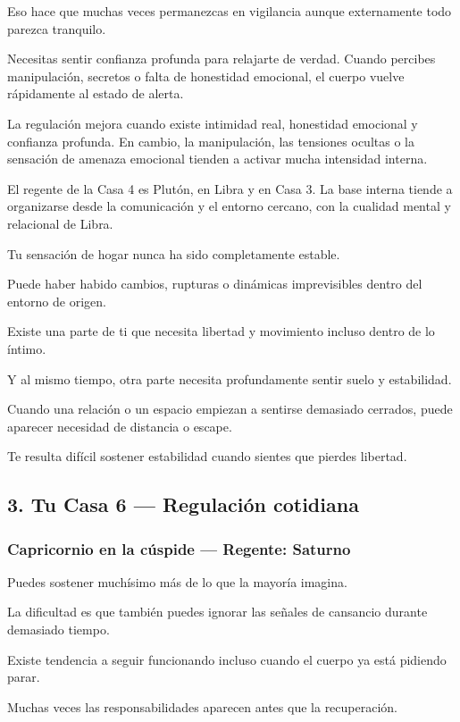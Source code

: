 \documentclass[11pt,a4paper]{article}
\begin{document}
Eso hace que muchas veces permanezcas en vigilancia aunque externamente todo parezca tranquilo.

Necesitas sentir confianza profunda para relajarte de verdad. Cuando percibes manipulación, secretos o falta de honestidad emocional, el cuerpo vuelve rápidamente al estado de alerta.

La regulación mejora cuando existe intimidad real, honestidad emocional y confianza profunda. En cambio, la manipulación, las tensiones ocultas o la sensación de amenaza emocional tienden a activar mucha intensidad interna.

El regente de la Casa 4 es Plutón, en Libra y en Casa 3. La base interna tiende a organizarse desde la comunicación y el entorno cercano, con la cualidad mental y relacional de Libra.

Tu sensación de hogar nunca ha sido completamente estable.

Puede haber habido cambios, rupturas o dinámicas imprevisibles dentro del entorno de origen.

Existe una parte de ti que necesita libertad y movimiento incluso dentro de lo íntimo.

Y al mismo tiempo, otra parte necesita profundamente sentir suelo y estabilidad.

Cuando una relación o un espacio empiezan a sentirse demasiado cerrados, puede aparecer necesidad de distancia o escape.

Te resulta difícil sostener estabilidad cuando sientes que pierdes libertad.

\subsection{3. Tu Casa 6 — Regulación cotidiana}

\subsubsection*{Capricornio en la cúspide — Regente: Saturno}

Puedes sostener muchísimo más de lo que la mayoría imagina.

La dificultad es que también puedes ignorar las señales de cansancio durante demasiado tiempo.

Existe tendencia a seguir funcionando incluso cuando el cuerpo ya está pidiendo parar.

Muchas veces las responsabilidades aparecen antes que la recuperación.
\end{document}
